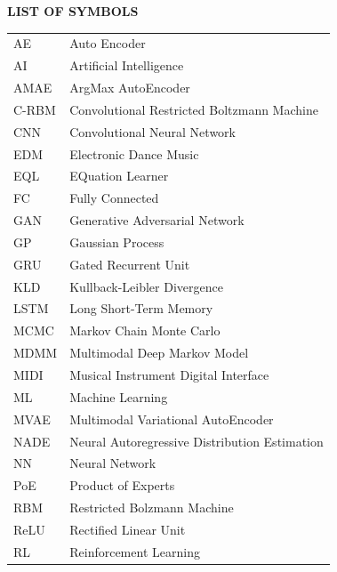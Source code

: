 \documentclass[12pt]{report}
\begin{document}
\newpage
\begin{center}
    \textbf{\Large LIST OF SYMBOLS}\\
    \vspace{2cm}
    \begin{longtable}{ll}
        AE & Auto Encoder \\
        AI & Artificial Intelligence \\
        AMAE & ArgMax AutoEncoder \\
        C-RBM & Convolutional Restricted Boltzmann Machine \\
        CNN & Convolutional Neural Network \\
        EDM & Electronic Dance Music \\
        EQL & EQuation Learner \\
        FC & Fully Connected \\
        GAN & Generative Adversarial Network \\
        GP & Gaussian Process \\
        GRU & Gated Recurrent Unit \\
        KLD & Kullback-Leibler Divergence \\
        LSTM & Long Short-Term Memory \\
        MCMC & Markov Chain Monte Carlo \\
        MDMM & Multimodal Deep Markov Model \\
        MIDI & Musical Instrument Digital Interface \\
        ML & Machine Learning \\
        MVAE & Multimodal Variational AutoEncoder \\
        NADE & Neural Autoregressive Distribution Estimation \\
        NN & Neural Network \\
        PoE & Product of Experts \\
        RBM & Restricted Bolzmann Machine \\
        ReLU & Rectified Linear Unit \\
        RL & Reinforcement Learning \\

\end{longtable}
\end{center}
\end{document}
